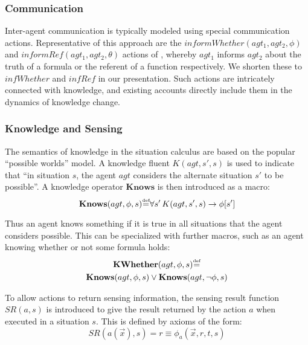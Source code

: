 \documentclass[letterpaper]{article}
\newcommand{\isdef}{\hbox{$\stackrel{\mbox{\tiny def}}{=}$}}
\begin{document}
\subsubsection{Communication}

Inter-agent communication is typically modeled using special communication
actions. Representative of this approach are the $informWhether(agt_{1},agt_{2},\phi)$
and $informRef(agt_{1},agt_{2},\theta)$ actions of \cite{shapiro01casl_feat_inter},
whereby $agt_{1}$ informs $agt_{2}$ about the truth of a formula
or the referent of a function respectively. We shorten these to $infWhether$
and $infRef$ in our presentation. Such actions are intricately connected
with knowledge, and existing accounts directly include them in the
dynamics of knowledge change.


\subsubsection{Knowledge and Sensing}

The semantics of knowledge in the situation calculus \cite{scherl03sc_knowledge}
are based on the popular {}``possible worlds'' model. A knowledge
fluent $K(agt,s',s)$ is used to indicate that {}``in situation $s$,
the agent $agt$ considers the alternate situation $s'$ to be possible''.
A knowledge operator $\mathbf{Knows}$ is then introduced as a macro:
\begin{equation}
\mathbf{Knows}(agt,\phi,s)\isdef\forall s'\, K(agt,s',s)\rightarrow\phi[s']\label{eqn:knows_def}\end{equation}


Thus an agent knows something if it is true in all situations that
the agent considers possible. This can be specialized with further
macros, such as an agent knowing whether or not some formula holds:
\begin{multline*}
\mathbf{KWhether}(agt,\phi,s)\isdef\\
\mathbf{Knows}(agt,\phi,s)\vee\mathbf{Knows}(agt,\neg\phi,s)\end{multline*}


To allow actions to return sensing information, the sensing result
function $SR(a,s)$ is introduced to give the result returned by the
action $a$ when executed in a situation $s$. This is defined by
axioms of the form: \begin{equation*}
SR(a(\overrightarrow{x}),s)=r\equiv\phi_{a}(\overrightarrow{x},r,t,s)\end{equation*}
\end{document}

